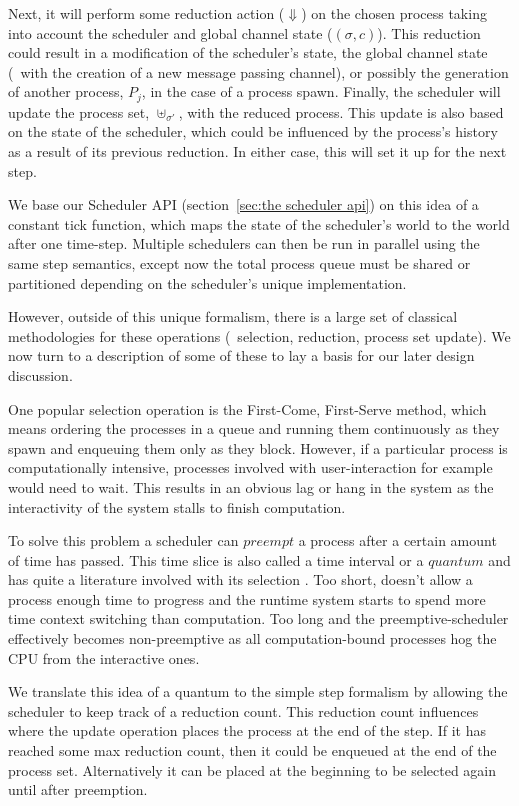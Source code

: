 Next, it will perform some reduction action ($\Downarrow$) on the chosen process
taking into account the scheduler and global channel state ($(\sigma,c)$). This
reduction could result in a modification of the scheduler's state, the global channel
state (\ie~with the creation of a new message passing channel), or possibly the 
generation of another process, $P_j$, in the case of a process spawn. 
Finally, the scheduler will update the process set, $\uplus_{\sigma'}$, with the
reduced process. This update is also based on the state of the scheduler, which
could be influenced by the process's history as a result of its previous reduction.
In either case, this will set it up for the next step.

We base our Scheduler API (section~\ref{sec:the scheduler api}) on this 
idea of a constant tick function, which maps the state of the scheduler's world 
to the world after one time-step. Multiple schedulers can then be run in parallel 
using the same step semantics, except now the total process queue must be shared 
or partitioned depending on the scheduler's unique implementation.

However, outside of this unique formalism, there is a large set of classical
methodologies for these operations (\eg~selection, reduction, process set update).
We now turn to a description of some of these to lay a basis for our later 
design discussion.

One popular selection operation is the First-Come, First-Serve method, 
which means ordering 
the processes in a queue and running them continuously as they spawn and enqueuing them only as they 
block. However, if a particular
process is computationally intensive, processes involved with user-interaction 
for example would need to wait. This results in an obvious lag or hang in the 
system as the interactivity of the system stalls to finish computation.

To solve this problem a scheduler can $preempt$ a process after a certain amount
of time has passed. This time slice is also called a time interval or a $quantum$
and has quite a literature involved with its selection
\cite{alam2008finding, mostafa2010finding, saeidi2012determining}.
Too short, doesn't allow a process enough time to progress and the runtime system
starts to spend more time context switching than computation. Too long and the
preemptive-scheduler effectively becomes non-preemptive as all computation-bound
processes hog the CPU from the interactive ones.

We translate this idea of a quantum to the simple step formalism by allowing the
scheduler to keep track of a reduction count. This reduction count influences 
where the update operation places the process at the end of the step. If it has
reached some max reduction count, then it could be enqueued at the end of the 
process set. Alternatively it can be placed at the beginning to be selected
again until after preemption.

